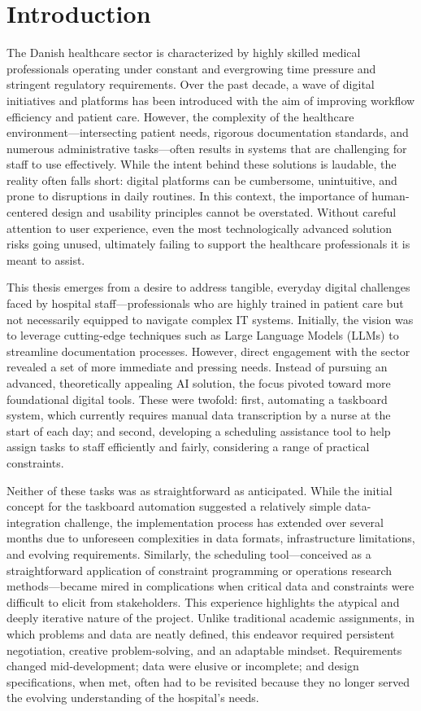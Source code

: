 \section{Introduction}
The Danish healthcare sector is characterized by highly skilled medical professionals operating under constant and evergrowing time pressure and stringent regulatory requirements. Over the past decade, a wave of digital initiatives and platforms has been introduced with the aim of improving workflow efficiency and patient care. However, the complexity of the healthcare environment—intersecting patient needs, rigorous documentation standards, and numerous administrative tasks—often results in systems that are challenging for staff to use effectively. While the intent behind these solutions is laudable, the reality often falls short: digital platforms can be cumbersome, unintuitive, and prone to disruptions in daily routines. In this context, the importance of human-centered design and usability principles cannot be overstated. Without careful attention to user experience, even the most technologically advanced solution risks going unused, ultimately failing to support the healthcare professionals it is meant to assist.

This thesis emerges from a desire to address tangible, everyday digital challenges faced by hospital staff—professionals who are highly trained in patient care but not necessarily equipped to navigate complex IT systems. Initially, the vision was to leverage cutting-edge techniques such as Large Language Models (LLMs) to streamline documentation processes. However, direct engagement with the sector revealed a set of more immediate and pressing needs. Instead of pursuing an advanced, theoretically appealing AI solution, the focus pivoted toward more foundational digital tools. These were twofold: first, automating a taskboard system, which currently requires manual data transcription by a nurse at the start of each day; and second, developing a scheduling assistance tool to help assign tasks to staff efficiently and fairly, considering a range of practical constraints.

Neither of these tasks was as straightforward as anticipated. While the initial concept for the taskboard automation suggested a relatively simple data-integration challenge, the implementation process has extended over several months due to unforeseen complexities in data formats, infrastructure limitations, and evolving requirements. Similarly, the scheduling tool—conceived as a straightforward application of constraint programming or operations research methods—became mired in complications when critical data and constraints were difficult to elicit from stakeholders. This experience highlights the atypical and deeply iterative nature of the project. Unlike traditional academic assignments, in which problems and data are neatly defined, this endeavor required persistent negotiation, creative problem-solving, and an adaptable mindset. Requirements changed mid-development; data were elusive or incomplete; and design specifications, when met, often had to be revisited because they no longer served the evolving understanding of the hospital's needs.

